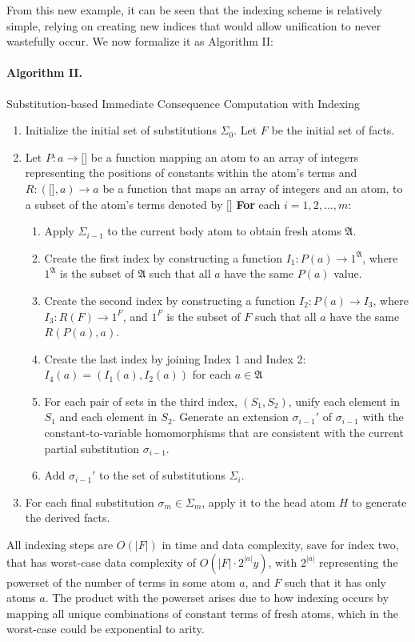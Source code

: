 \documentclass[sigconf,screen,review,natbib]{acmart}
\theoremstyle{definition}
\begin{document}
From this new example, it can be seen that the indexing scheme is relatively simple, relying on creating new indices that would allow unification
to never wastefully occur. We now formalize it as Algorithm II:
\paragraph{Algorithm II.} Substitution-based Immediate Consequence Computation with Indexing
\begin{enumerate}
	\item Initialize the initial set of substitutions $\Sigma_{0}$. Let $F$ be the initial set of facts.
	\item Let $P : a \to [\mathbb]$ be a function mapping an atom to an array of integers representing the positions of constants within the atom's terms and
	      $R : ([\mathbb], a) \to a$ be a function that maps an array of integers and an atom, to a subset of the atom's terms denoted by $[\mathbb]$
	      \textbf{For} each $i = 1, 2, \ldots, m$: \begin{enumerate}
		      \item Apply $\Sigma_{i-1}$ to the current body atom to obtain fresh atoms $\mathfrak{A}$.
		      \item Create the first index by constructing a function $I_1 : P(a) \to 1^{\mathfrak{A}}$, where $1^{\mathfrak{A}}$ is the subset of
		            $\mathfrak{A}$ such that all $a$ have the same $P(a)$ value.
		      \item Create the second index by constructing a function $I_2 : P(a) \to I_3$, where $I_3 : R(F) \to 1^{F}$, and $1^{F}$ is the subset
		            of $F$ such that all $a$ have the same $R(P(a), a)$.
		      \item Create the last index by joining Index 1 and Index 2: $I_4(a) = (I_1(a), I_2(a))$ for each $a \in \mathfrak{A}$
		      \item For each pair of sets in the third index, $(S_1, S_2)$, unify each element in $S_1$ and each element in $S_2$. Generate an extension
		            $\sigma_{i-1}'$ of $\sigma_{i-1}$ with the constant-to-variable homomorphisms that are consistent with the current partial substitution $\sigma_{i-1}$.
		      \item Add $\sigma_{i-1}'$ to the set of substitutions $\Sigma_i$.
	      \end{enumerate}
	\item For each final substitution $\sigma_m \in \Sigma_m$, apply it to the head atom $H$ to generate the derived facts.
\end{enumerate}
All indexing steps are $O(|F|)$ in time and data complexity, save for index two, that has worst-case data complexity of $O(|F| \cdot 2^{|a|}y)$, with $2^{|a|}$
representing the powerset of the number of terms in some atom $a$, and $F$ such that it has only atoms $a$. The product with the powerset arises due to how
indexing occurs by mapping all unique combinations of constant terms of fresh atoms, which in the worst-case could be exponential to arity.
\end{document}
